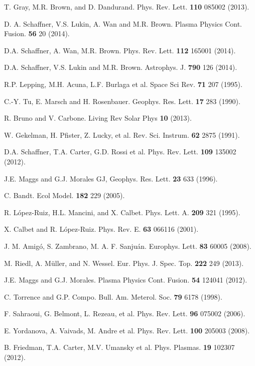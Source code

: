 \documentclass[aps,prx,twocolumn,secnumarabic,nobalancelastpage,amsmath,amssymb,
nofootinbib]{revtex4-1}
\begin{document}
\begin{thebibliography}{99}
T. Gray, M.R. Brown, and D. Dandurand. Phys. Rev. Lett. {\bf 110} 085002 (2013).

D. A. Schaffner, V.S. Lukin, A. Wan and M.R. Brown. Plasma Physics Cont. Fusion. {\bf 56} 20 (2014).

D.A. Schaffner, A. Wan, M.R. Brown. Phys. Rev. Lett. {\bf 112} 165001 (2014).

D.A. Schaffner, V.S. Lukin and M.R. Brown. Astrophys. J. {\bf 790} 126 (2014).

R.P. Lepping, M.H. Acuna, L.F. Burlaga et al. Space Sci Rev. {\bf 71} 207 (1995).

C.-Y. Tu, E. Marsch and H. Rosenbauer. Geophys. Res. Lett. {\bf 17} 283 (1990).

R. Bruno and V. Carbone. Living Rev Solar Phys {\bf 10} (2013).

W. Gekelman, H. Pfister, Z. Lucky, et al. Rev. Sci. Instrum. {\bf 62} 2875 (1991).

D.A. Schaffner, T.A. Carter, G.D. Rossi et al. Phys. Rev. Lett. {\bf 109} 135002 (2012).

J.E. Maggs and G.J. Morales GJ, Geophys. Res. Lett. {\bf 23} 633 (1996).

C. Bandt. Ecol Model. {\bf 182} 229 (2005).

R. L{\'o}pez-Ruiz, H.L. Mancini, and X. Calbet. Phys. Lett. A. {\bf 209} 321 (1995).

X. Calbet and R.  L{\'o}pez-Ruiz. Phys. Rev. E. {\bf 63} 066116 (2001).

J. M. Amig{\'o}, S. Zambrano, M. A. F. Sanju{\'a}n. Europhys. Lett. {\bf 83} 60005 (2008).

M. Riedl, A. M{\"u}ller, and N. Wessel. Eur. Phys. J. Spec. Top. {\bf 222} 249 (2013).

J.E. Maggs and G.J. Morales. Plasma Physics Cont. Fusion. {\bf 54} 124041 (2012).

C. Torrence and G.P. Compo. Bull. Am. Meterol. Soc. {\bf 79} 6178 (1998).

F. Sahraoui, G. Belmont, L. Rezeau, et al. Phys. Rev. Lett. {\bf 96} 075002 (2006).

E. Yordanova, A. Vaivads, M. Andre et al. Phys. Rev. Lett. {\bf 100} 205003 (2008).

B. Friedman, T.A. Carter, M.V. Umansky et al. Phys. Plasmas. {\bf 19} 102307 (2012).

\end{thebibliography}

%
%
\end{document}
